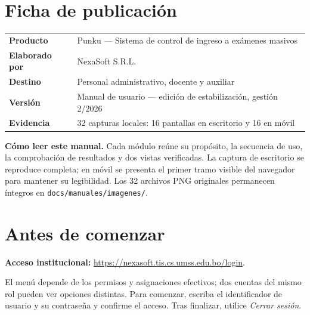 \documentclass[11pt,a4paper]{article}
\begin{document}
\hypersetup{pageanchor=true}


\section*{Ficha de publicación}

\begin{tabularx}{\linewidth}{
 >{\bfseries}p{34mm}X
}
\toprule
Producto &
Punku — Sistema de control de ingreso a exámenes masivos\\
Elaborado por & NexaSoft S.R.L.\\
Destino & Personal administrativo, docente y auxiliar\\
Versión &
Manual de usuario — edición de estabilización, gestión 2/2026\\
Evidencia &
32 capturas locales: 16 pantallas en escritorio y 16 en móvil\\
\bottomrule
\end{tabularx}

\begin{notebox}
\textbf{Cómo leer este manual.}
Cada módulo reúne su propósito, la secuencia de uso,
la comprobación de resultados y dos vistas verificadas.
La captura de escritorio se reproduce completa; en móvil
se presenta el primer tramo visible del navegador para
mantener su legibilidad. Los 32 archivos PNG originales
permanecen íntegros en
\texttt{docs/manuales/imagenes/}.
\end{notebox}

\tableofcontents
\clearpage
{}

\section{Antes de comenzar}

\textbf{Acceso institucional:}
\url{https://nexasoft.tis.cs.umss.edu.bo/login}.

El menú depende de los permisos y asignaciones efectivos;
dos cuentas del mismo rol pueden ver opciones distintas.
Para comenzar, escriba el identificador de usuario y su
contraseña y confirme el acceso. Tras finalizar, utilice
\textit{Cerrar sesión}.
\end{document}
